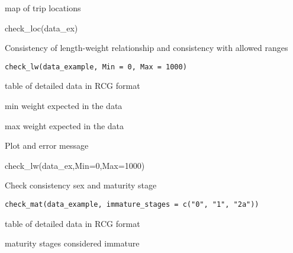 \documentclass[a4paper]{book}
\begin{document}
%
\begin{Value}
map of trip locations
\end{Value}
%
\begin{Examples}
\begin{ExampleCode}
check_loc(data_ex)
\end{ExampleCode}
\end{Examples}
%
\begin{Description}\relax
Consistency of length-weight relationship and consistency with allowed ranges
\end{Description}
%
\begin{Usage}
\begin{verbatim}
check_lw(data_example, Min = 0, Max = 1000)
\end{verbatim}
\end{Usage}
%
\begin{Arguments}
\begin{ldescription}
\item[\code{data\_example}] table of detailed data in RCG format

\item[\code{Min}] min weight expected in the data

\item[\code{Max}] max weight expected in the data
\end{ldescription}
\end{Arguments}
%
\begin{Value}
Plot and error message
\end{Value}
%
\begin{Examples}
\begin{ExampleCode}
check_lw(data_ex,Min=0,Max=1000)
\end{ExampleCode}
\end{Examples}
%
\begin{Description}\relax
Check consistency sex and maturity stage
\end{Description}
%
\begin{Usage}
\begin{verbatim}
check_mat(data_example, immature_stages = c("0", "1", "2a"))
\end{verbatim}
\end{Usage}
%
\begin{Arguments}
\begin{ldescription}
\item[\code{data\_example}] table of detailed data in RCG format

\item[\code{immature\_stages}] maturity stages considered immature
\end{ldescription}
\end{Arguments}
\end{document}

